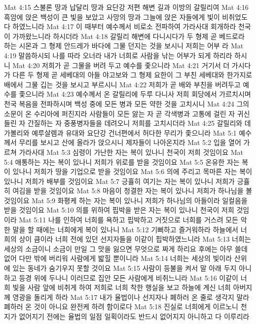 Mat 4:15  스불론 땅과 납달리 땅과 요단강 저편 해변 길과 이방의 갈릴리여
Mat 4:16  흑암에 앉은 백성이 큰 빛을 보았고 사망의 땅과 그늘에 앉은 자들에게 빛이 비취었도다 하였느니라
Mat 4:17  이 때부터 예수께서 비로소 전파하여 가라사대 회개하라 천국이 가까왔느니라 하시더라
Mat 4:18  갈릴리 해변에 다니시다가 두 형제 곧 베드로라 하는 시몬과 그 형제 안드레가 바다에 그물 던지는 것을 보시니 저희는 어부 라
Mat 4:19  말씀하시되 나를 따라 오너라 내가 너희로 사람을 낚는 어부가 되게 하리라 하시니
Mat 4:20  저희가 곧 그물을 버려 두고 예수를 좇으니라
Mat 4:21  거기서 더 가시다가 다른 두 형제 곧 세베대의 아들 야고보와 그 형제 요한이 그 부친 세베대와 한가지로 배에서 그물 깁는 것을 보시고 부르시니
Mat 4:22  저희가 곧 배와 부친을 버려두고 예수를 좇으니라
Mat 4:23  예수께서 온 갈릴리에 두루 다니사 저희 회당에서 가르치시며 천국 복음을 전파하시며 백성 중에 모든 병과 모든 약한 것을 고치시니
Mat 4:24  그의 소문이 온 수리아에 퍼진지라 사람들이 모든 앓는 자 곧 각색병과 고통에 걸린 자 귀신 들린 자 간질하는 자 중풍병자들을 데려오니 저희를 고치시더라
Mat 4:25  갈릴리와 데가볼리와 예루살렘과 유대와 요단강 건너편에서 허다한 무리가 좇으니라
Mat 5:1  예수께서 무리를 보시고 산에 올라가 앉으시니 제자들이 나아온지라
Mat 5:2  입을 열어 가르쳐 가라사대
Mat 5:3  심령이 가난한 자는 복이 있나니 천국이 저희 것임이요
Mat 5:4  애통하는 자는 복이 있나니 저희가 위로를 받을 것임이요
Mat 5:5  온유한 자는 복이 있나니 저희가 땅을 기업으로 받을 것임이요
Mat 5:6  의에 주리고 목마른 자는 복이 있나니 저희가 배부를 것임이요
Mat 5:7  긍휼히 여기는 자는 복이 있나니 저희가 긍휼히 여김을 받을 것임이요
Mat 5:8  마음이 청결한 자는 복이 있나니 저희가 하나님을 볼 것임이요
Mat 5:9  화평케 하는 자는 복이 있나니 저희가 하나님의 아들이라 일컬음을 받을 것임이요
Mat 5:10  의를 위하여 핍박을 받은 자는 복이 있나니 천국이 저희 것임이라
Mat 5:11  나를 인하여 너희를 욕하고 핍박하고 거짓으로 너희를 거스려 모든 악한 말을 할 때에는 너희에게 복이 있나니
Mat 5:12  기뻐하고 즐거워하라 하늘에서 너희의 상이 큼이라 너희 전에 있던 선지자들을 이같이 핍박하였느니라
Mat 5:13  너희는 세상의 소금이니 소금이 만일 그 맛을 잃으면 무엇으로 짜게 하리요 후에는 아무 쓸데 없어 다만 밖에 버리워 사람에게 밟힐 뿐이니라
Mat 5:14  너희는 세상의 빛이라 산위에 있는 동네가 숨기우지 못할 것이요
Mat 5:15  사람이 등불을 켜서 말 아래 두지 아니하고 등경 위에 두나니 이러므로 집안 모든 사람에게 비취느니라
Mat 5:16  이같이 너희 빛을 사람 앞에 비취게 하여 저희로 너희 착한 행실을 보고 하늘에 계신 너희 아버지께 영광을 돌리게 하라
Mat 5:17  내가 율법이나 선지자나 폐하러 온 줄로 생각지 말라 폐하러 온 것이 아니요 완전케 하려 함이로다
Mat 5:18  진실로 너희에게 이르노니 천지가 없어지기 전에는 율법의 일점 일획이라도 반드시 없어지지 아니하고 다 이루리라
